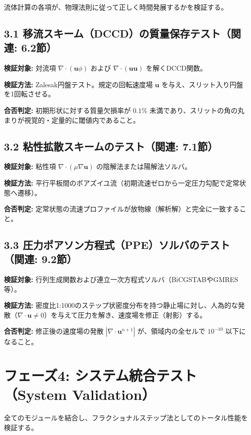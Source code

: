 \documentclass[12pt, a4paper, titlepage]{article}
\begin{document}
流体計算の各項が、物理法則に従って正しく時間発展するかを検証する。

\subsection*{3.1 移流スキーム（DCCD）の質量保存テスト（関連: 6.2節）}

\textbf{検証対象:} 対流項 $\nabla \cdot (\mathbf{u} \phi)$ および $\nabla \cdot (\mathbf{u} \mathbf{u})$ を解くDCCD関数。

\textbf{検証方法:} Zalesak円盤テスト。規定の回転速度場 $\mathbf{u}$ を与え、スリット入り円盤を1回転させる。

\textbf{合否判定:} 初期形状に対する質量欠損率が $0.1\%$ 未満であり、スリットの角の丸まりが視覚的・定量的に閾値内であること。

\subsection*{3.2 粘性拡散スキームのテスト（関連: 7.1節）}

\textbf{検証対象:} 粘性項 $\nabla \cdot (\mu \nabla \mathbf{u})$ の陰解法または陽解法ソルバ。

\textbf{検証方法:} 平行平板間のポアズイユ流（初期流速ゼロから一定圧力勾配で定常状態へ遷移）。

\textbf{合否判定:} 定常状態の流速プロファイルが放物線（解析解）と完全に一致すること。

\subsection*{3.3 圧力ポアソン方程式（PPE）ソルバのテスト（関連: 9.2節）}

\textbf{検証対象:} 行列生成関数および連立一次方程式ソルバ（BiCGSTABやGMRES等）。

\textbf{検証方法:} 密度比1:1000のステップ状密度分布を持つ静止場に対し、人為的な発散（$\nabla \cdot \mathbf{u} \neq 0$）を与えて圧力を解き、速度場を修正（射影）する。

\textbf{合否判定:} 修正後の速度場の発散 $|\nabla \cdot \mathbf{u}^{n+1}|$ が、領域内の全セルで $10^{-10}$ 以下になること。

\section*{フェーズ4: システム統合テスト（System Validation）}

全てのモジュールを結合し、フラクショナルステップ法としてのトータル性能を検証する。
\end{document}
